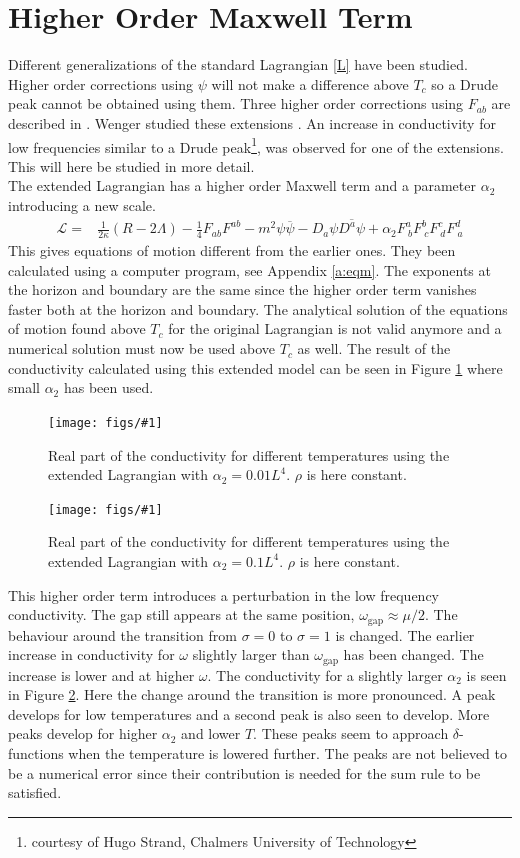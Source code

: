 \documentclass[12pt]{report}
\newcommand{\fig}[2]{
\begin{figure}
\centering
\texttt{[image: figs/\#1]}
\caption{#2}
\end{figure}
}
\begin{document}
\section{Higher Order Maxwell Term}
Different generalizations of the standard Lagrangian \eqref{L} have been studied. Higher order corrections using $\psi$ will not make a difference above $T_c$ so a Drude peak cannot be obtained using them. Three higher order corrections using $F_{ab}$ are described in \cite{Myers:2010pk}. Wenger studied these extensions \cite{Wenger2012}. An increase in conductivity for low frequencies similar to a Drude peak\footnote{courtesy of Hugo Strand, Chalmers University of Technology}, was observed for one of the extensions. This will here be studied in more detail.\\
The extended Lagrangian has a higher order Maxwell term and a parameter $\alpha_2$ introducing a new scale.
\begin{eqnarray}
 \mathcal{L}=&\frac{1}{2\kappa}\left(R-2\Lambda\right)-\frac{1}{4}F_{ab}F^{ab}-m^2\psi\overline{\psi}-D_a\psi\overline{D^a\psi}
+\alpha_2F^a_{\ b}F^b_{\ c}F^c_{\ d}F^d_{\ a}\label{L2}
\end{eqnarray}
This gives equations of motion different from the earlier ones. They been calculated using a computer program, see Appendix \ref{a:eqm}. The exponents at the horizon and boundary are the same since the higher order term vanishes faster both at the horizon and boundary. The analytical solution of the equations of motion found above $T_c$ for the original Lagrangian is not valid anymore and a numerical solution must now be used above $T_c$ as well. The result of the conductivity calculated using this extended model can be seen in Figure \ref{f:cond_a2_1} where  small $\alpha_2$ has been used.

\fig{cond_Ts_a2_0.01_v2.pdf}{Real part of the conductivity for different temperatures using the extended Lagrangian with $\alpha_2=0.01L^4$. $\rho$ is here constant.\label{f:cond_a2_1}}

\fig{cond_Ts_a2_0.1_v2.pdf}{Real part of the conductivity for different temperatures using the extended Lagrangian with $\alpha_2=0.1L^4$. $\rho$ is here constant.\label{f:cond_a2_2}}

This higher order term introduces a perturbation in the low frequency conductivity. The gap still appears at the same position, $\omega_\mathrm{gap}\approx\mu/2$. The behaviour around the transition from $\sigma=0$ to $\sigma=1$ is changed. The earlier increase in conductivity for $\omega$ slightly larger than $\omega_\mathrm{gap}$ has been changed. The increase is lower and at higher $\omega$. The conductivity for a slightly larger $\alpha_2$ is seen in Figure \ref{f:cond_a2_2}. Here the change around the transition is more pronounced. A peak develops for low temperatures and a second peak is also seen to develop. More peaks develop for higher $\alpha_2$ and lower $T$. These peaks seem to approach $\delta$-functions when the temperature is lowered further. The peaks are not believed to be a numerical error since their contribution is needed for the sum rule to be satisfied.\\
\end{document}
